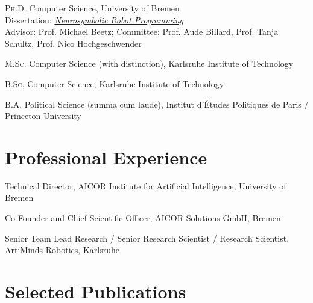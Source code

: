 \documentclass[11pt]{article} %
\begin{document}
\textsc{Ph.D.} Computer Science, University of Bremen\\
Dissertation: \href{https://doi.org/10.26092/elib/3727}{\textit{Neurosymbolic Robot Programming}}\\
Advisor: Prof. Michael Beetz; Committee: Prof. Aude Billard, Prof. Tanja Schultz, Prof. Nico Hochgeschwender

\medskip

\textsc{M.Sc.} Computer Science (with distinction), Karlsruhe Institute of Technology

\medskip

\textsc{B.Sc.} Computer Science, Karlsruhe Institute of Technology

\medskip

\textsc{B.A.} Political Science (summa cum laude), Institut d'Études Politiques de Paris / Princeton University


\section*{Professional Experience}

Technical Director, AICOR Institute for Artificial Intelligence, University of Bremen

\medskip

Co-Founder and Chief Scientific Officer, AICOR Solutions GmbH, Bremen

\medskip

Senior Team Lead Research / Senior Research Scientist / Research Scientist, ArtiMinds Robotics, Karlsruhe


\section*{Selected Publications}

\nocite{*}
\setlength{\bibitemsep}{0pt}
\setlength{\bibparsep}{0pt}
\setlength{\bibhang}{0pt}
\end{document}
